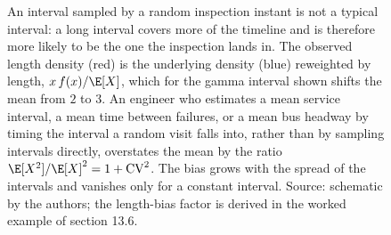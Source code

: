\begin{figure}[htbp]
\centering
{}
\caption[The inspection paradox]{An interval sampled by a random
inspection instant is not a typical interval: a long interval covers
more of the timeline and is therefore more likely to be the one the
inspection lands in. The observed length density (red) is the underlying
density (blue) reweighted by length, $x\,f(x)/\E[X]$, which for the
gamma interval shown shifts the mean from $2$ to $3$. An engineer who
estimates a mean service interval, a mean time between failures, or a
mean bus headway by timing the interval a random visit falls into,
rather than by sampling intervals directly, overstates the mean by the
ratio $\E[X^2]/\E[X]^2 = 1 + \mathrm{CV}^2$. The bias grows with the
spread of the intervals and vanishes only for a constant interval.
Source: schematic by the authors; the length-bias factor is derived in
the worked example of section 13.6.}
\label{fig:vol02ch13:inspection-paradox}
\end{figure}
